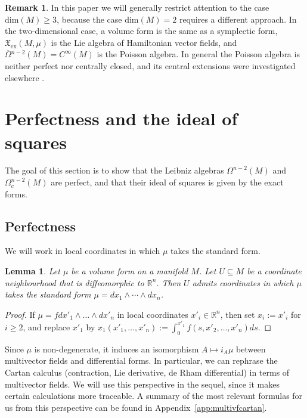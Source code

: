 \documentclass{article}
\newcommand{\ex}{\mathrm{ex}}
\newcommand{\fX}{\mathfrak{X}}
\newcommand{\R}{\mathbb{R}}
\newcommand{\oline}{\overline}
\newtheorem{Lemma}[Theorem]{Lemma}
\theoremstyle{definition}
\newtheorem{Remark}[Theorem]{Remark}
\begin{document}
\begin{Remark}
In this paper 
we will generally restrict attention to the case $\mathrm{dim}(M)\geq 3$, because the case $\mathrm{dim}(M)=2$ requires a different approach. In the two-dimensional case, a volume form is the same as a symplectic form, $\fX_{\ex}(M,\mu)$ is the Lie algebra of Hamiltonian vector fields, and $\oline{\Omega}{}^{n-2}(M) = C^{\infty}(M)$ is the Poisson algebra. In general the Poisson algebra is neither perfect nor centrally closed, and its central extensions were investigated elsewhere \cite{JV16}.
\end{Remark}



\section{Perfectness and the ideal of squares}\label{sec:perf}

The goal of this section is to show that the Leibniz algebras $\Omega^{n-2}(M)$ and $\Omega_{c}^{n-2}(M)$ are perfect, 
and that their ideal of squares is given by the exact forms.

\subsection{Perfectness}

We will work in local coordinates in which $\mu$ takes the standard form. 
\begin{Lemma}\label{Lemma:localcoordinates} Let $\mu$ be a volume form on a manifold $M$. Let $U \subseteq M$ be a coordinate neighbourhood that is diffeomorphic to $\R^n$. Then $U$ admits coordinates in which $\mu$ takes the standard form   $\mu = dx_1\wedge \cdots \wedge dx_n$.
\end{Lemma}
\begin{proof}

If $\mu = f dx'_1\wedge \ldots \wedge dx'_n$ in local coordinates $x'_i \in \R^n$, then set $x_i := x'_i$ for $i\geq 2$, and replace $x'_1$ by
$x_{1}(x'_1, \ldots, x'_n):= \int_{0}^{x'_1}f(s, x'_2, \ldots, x'_n)ds$.
\end{proof}


Since $\mu$ is non-degenerate, it induces an isomorphism $A \mapsto i_{A}\mu$ between multivector fields and differential forms. In particular, we can rephrase 
the Cartan calculus (contraction, Lie derivative, de Rham differential) in terms of multivector fields. We will use this perspective in the sequel, since it makes certain calculations more traceable. A summary of the most relevant formulas for us from this perspective can be found in Appendix~\ref{app:multivfcartan}. 
\end{document}
